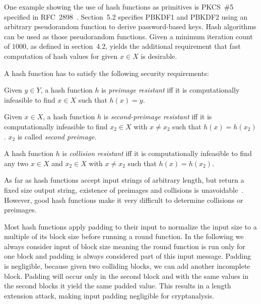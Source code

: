 One example showing the use of hash functions as primitives is PKCS~\#5
specified in RFC~2898~\cite{rfc2898}. Section~5.2 specifies PBKDF1 and PBKDF2
using an arbitrary pseudorandom function to derive password-based keys.
Hash algorithms can be used as those pseudorandom functions.
Given a minimum iteration count of $1000$, as defined in section~4.2,
yields the additional requirement that fast computation of hash values
for given $x \in X$ is desirable.

A hash function has to satisfy the following security requirements:

\begin{defi}
  Given $y \in Y$,
  a hash function $h$ is \emph{preimage resistant} iff it is computationally infeasible
  to find $x \in X$ such that $h(x) = y$.
\end{defi}

\begin{defi}
  Given $x \in X$,
  a hash function $h$ is \emph{second-preimage resistant} iff it is computationally infeasible
  to find $x_2 \in X$ with $x \neq x_2$ such that $h(x) = h(x_2)$.
  $x_2$ is called \emph{second preimage}.
\end{defi}

\begin{defi}
  A hash function $h$ is \emph{collision resistant} iff it is computationally infeasible to
  find any two $x \in X$ and $x_2 \in X$ with $x \neq x_2$ such that $h(x) = h(x_2)$.
\end{defi}

As far as hash functions accept input strings of arbitrary length, but return a fixed
size output string, existence of preimages and collisions is unavoidable~\cite{schlaffer}.
However, good hash functions make it very difficult to determine collisions or preimages.

Most hash functions apply padding to their input to normalize the input size to a multiple
of its block size before running a round function. In the following we always consider
input of block size meaning the round function is run only for one block and padding is
always considered part of this input message. Padding is negligible, because given two
colliding blocks, we can add another incomplete block. Padding will occur only in the
second block and with the same values in the second blocks it yield the same padded value.
This results in a length extension attack, making input padding negligible for cryptanalysis.

